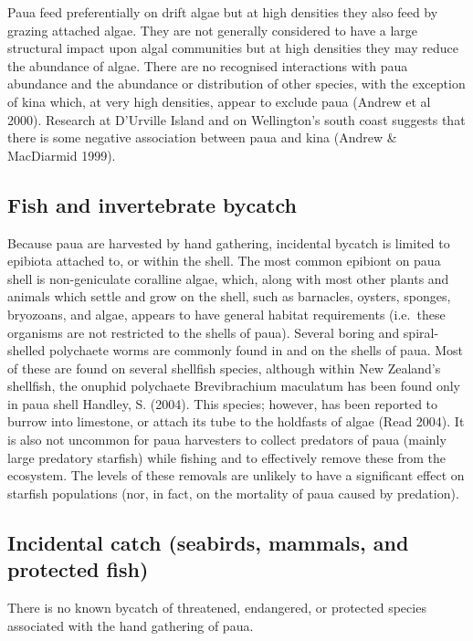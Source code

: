\documentclass{mpi-plenary}
\theoremstyle{definition}
\theoremstyle{definition}
\theoremstyle{definition}
\theoremstyle{remark}
\begin{document}
Paua feed preferentially on drift algae but at high densities they also
feed by grazing attached algae. They are not generally considered to
have a large structural impact upon algal communities but at high
densities they may reduce the abundance of algae. There are no
recognised interactions with paua abundance and the abundance or
distribution of other species, with the exception of kina which, at very
high densities, appear to exclude paua (Andrew et al 2000). Research at
D'Urville Island and on Wellington's south coast suggests that there is
some negative association between paua and kina (Andrew \& MacDiarmid
1999).

\subsection{Fish and invertebrate
bycatch}\label{fish-and-invertebrate-bycatch}

Because paua are harvested by hand gathering, incidental bycatch is
limited to epibiota attached to, or within the shell. The most common
epibiont on paua shell is non-geniculate coralline algae, which, along
with most other plants and animals which settle and grow on the shell,
such as barnacles, oysters, sponges, bryozoans, and algae, appears to
have general habitat requirements (i.e.~these organisms are not
restricted to the shells of paua). Several boring and spiral-shelled
polychaete worms are commonly found in and on the shells of paua. Most
of these are found on several shellfish species, although within New
Zealand's shellfish, the onuphid polychaete Brevibrachium maculatum has
been found only in paua shell Handley, S. (2004). This species; however,
has been reported to burrow into limestone, or attach its tube to the
holdfasts of algae (Read 2004). It is also not uncommon for paua
harvesters to collect predators of paua (mainly large predatory
starfish) while fishing and to effectively remove these from the
ecosystem. The levels of these removals are unlikely to have a
significant effect on starfish populations (nor, in fact, on the
mortality of paua caused by predation).

\subsection{Incidental catch (seabirds, mammals, and protected
fish)}\label{incidental-catch-seabirds-mammals-and-protected-fish}

There is no known bycatch of threatened, endangered, or protected
species associated with the hand gathering of paua.
\end{document}
